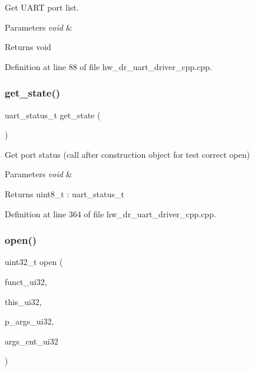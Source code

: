 Get U\+A\+RT port list. 


\begin{DoxyParams}{Parameters}
{\em void} & \\
\hline
\end{DoxyParams}
\begin{DoxyReturn}{Returns}
void 
\end{DoxyReturn}


Definition at line 88 of file hw\+\_\+dr\+\_\+uart\+\_\+driver\+\_\+cpp.\+cpp.

\mbox{\label{group___u_a_r_t_ga8669f54faf6db2b728afc356b565bce7}} 
\subsubsection{get\_state()}
{\footnotesize\ttfamily uart\+\_\+status\+\_\+t get\+\_\+state (\begin{DoxyParamCaption}\item[{void}]{ }\end{DoxyParamCaption})}



Get port status (call after construction object for test correct open) 


\begin{DoxyParams}{Parameters}
{\em void} & \\
\hline
\end{DoxyParams}
\begin{DoxyReturn}{Returns}
uint8\+\_\+t \+: uart\+\_\+status\+\_\+t 
\end{DoxyReturn}


Definition at line 364 of file hw\+\_\+dr\+\_\+uart\+\_\+driver\+\_\+cpp.\+cpp.

\mbox{\label{group___u_a_r_t_ga13d19359523c4a5fb930a4a07141abbb}} 
\subsubsection{open()\hspace{0.1cm}{\footnotesize\ttfamily [1/2]}}
{\footnotesize\ttfamily uint32\+\_\+t open (\begin{DoxyParamCaption}\item[{const uint32\+\_\+t}]{funct\+\_\+ui32,  }\item[{const uint32\+\_\+t}]{this\+\_\+ui32,  }\item[{const uint32\+\_\+t $\ast$}]{p\+\_\+args\+\_\+ui32,  }\item[{const uint32\+\_\+t}]{args\+\_\+cnt\+\_\+ui32 }\end{DoxyParamCaption})\hspace{0.3cm}{\ttfamily [static]}}



